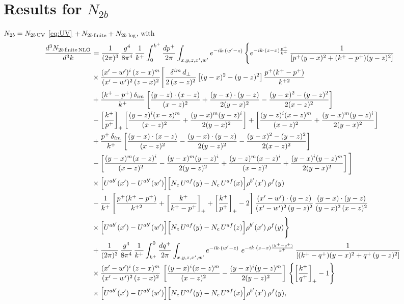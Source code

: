\documentclass[10pt]{article}
\numberwithin{equation}{section}
\begin{document}
\section{Results for $N_{2b}$}
$N_{2b}=N_{2b\,\rm UV}$ \eqref{eq:UV} $+\,N_{2b\,\rm finite}+N_{2b\,\log}$, with
\begin{align}
    \frac{d^{3}N_{2b\,\rm finite\,NLO}}{d^{3}k} & = \frac{1}{(2\pi)^{3}}\,\frac{g^{4}}{8\pi^{4}}\,\frac{1}{k^{+}}\int_{0}^{k^{+}}\frac{dp^{+}}{2\pi}\int_{x,y,z,x',w'}e^{-ik\cdot(w'-z)}\,\Bigg\{e^{-ik\cdot(z-x)\frac{p^{+}}{k^{+}}}\,\frac{1}{\left[p^{+}(y-x)^{2}+(k^{+}-p^{+})(y-z)^{2}\right]}\notag \\ & \times\frac{(x'-w')^{i}\,(z-x)^{m}}{(x'-w')^{2}\,(z-x)^{2}}\Bigg[\frac{\delta^{im}\,d_{\perp}}{2\,(x-z)^{2}}\left[(y-x)^{2}-(y-z)^{2}\right]\frac{p^{+}(k^{+}-p^{+})}{k^{+2}}\notag\\
&+\frac{(k^{+}-p^{+})\,\delta_{im}}{k^{+}}\left[\frac{(y-z)\cdot(x-z)}{(x-z)^{2}}+\frac{(y-x)\cdot(y-z)}{2(y-x)^{2}}-\frac{(y-x)^{2}-(y-z)^{2}}{2(x-z)^{2}}\right]\notag\\
&-\left[\frac{k^{+}}{p^{+}}\right]_{+}\left[\frac{(y-z)^{i}(x-z)^{m}}{(x-z)^{2}}+\frac{(y-x)^{m}(y-z)^{i}}{2(y-x)^{2}}\right]+\left[\frac{(y-z)^{i}(x-z)^{m}}{(x-z)^{2}}+\frac{(y-x)^{m}(y-z)^{i}}{2(y-x)^{2}}\right]\notag\\
&+\frac{p^{+}\,\delta_{im}}{k^{+}}\left[\frac{(y-x)\cdot(x-z)}{(x-z)^{2}}-\frac{(y-x)\cdot(y-z)}{2(y-z)^{2}}-\frac{(y-x)^{2}-(y-z)^{2}}{2(x-z)^{2}}\right]\notag\\
&-\left[\frac{(y-x)^{m}(x-z)^{i}}{(x-z)^{2}}-\frac{(y-x)^{m}(y-z)^{i}}{2(y-z)^{2}}+\frac{(y-z)^{m}(x-z)^{i}}{(x-z)^{2}}+\frac{(y-x)^{i}(y-z)^{m}}{2(y-x)^{2}}\right]\Bigg]\notag\\
&\times\Big[U^{ab'}(x')-U^{ab'}(w')\Big]\Big[N_{c}\,U^{af}(y)-N_{c}\,U^{af}(x)\Big]\rho^{b'}(x')\,\rho^{f}(y)\notag\\
&-\frac{1}{k^{+}}\left[\frac{p^{+}(k^{+}-p^{+})}{k^{+2}}+\left[\frac{k^{+}}{k^{+}-p^{+}}\right]_{+}+\left[\frac{k^{+}}{p^{+}}\right]_{+}-2\right]
\frac{(x'-w')\cdot(y-z)}{(x'-w')^{2}\,(y-z)^{2}}\,\frac{(y-x)\cdot(y-z)}{(y-x)^{2}\,(x-z)^{2}}\notag\\
&\times\Big[U^{ab'}(x')-U^{ab'}(w')\Big]\Big[N_{c}\,U^{af}(y)-N_{c}\,U^{af}(z)\Big]\rho^{b'}(x')\,\rho^{f}(y)\Bigg\}\notag \\ & + \frac{1}{(2\pi)^{3}}\,\frac{g^{4}}{8\pi^{4}}\,\frac{1}{k^{+}}\int_{k^{+}}^{0}\frac{dq^{+}}{2\pi}\int_{x,y,z,x',w'}e^{-ik\cdot(w'-z)}\ e^{-ik\cdot(z-x)\frac{(k^{+}-q^{+})}{k^{+}}}\,\frac{1}{\left[(k^{+}-q^{+})(y-x)^{2}+q^{+}\,(y-z)^{2}\right]}\notag \\ & \times\frac{(x'-w')^{i}\,(z-x)^{m}}{(x'-w')^{2}\,(z-x)^{2}}\,\left[\frac{(y-x)^{i}(x-z)^{m}}{(x-z)^{2}}-\frac{(y-x)^{i}(y-z)^{m}}{2(y-z)^{2}}\right]\,\left\{\left[\frac{k^{+}}{q^{+}}\right]_{+}-1\right\}\notag \\ & \times\Big[U^{ab'}(x')-U^{ab'}(w')\Big]\Big[N_{c}\,U^{af}(y)-N_{c}\,U^{af}(x)\Big]\rho^{b'}(x')\,\rho^{f}(y),
\label{eq:N2bfin}
\end{align}
\end{document}
